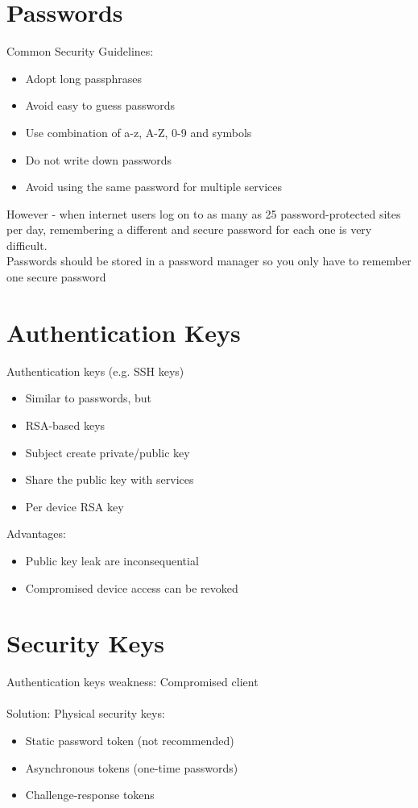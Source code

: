 \documentclass{article}[18pt]
\begin{document}
\section{Passwords}
Common Security Guidelines:
\begin{itemize}
	\item Adopt long passphrases
	\item Avoid easy to guess passwords
	\item Use combination of a-z, A-Z, 0-9 and symbols
	\item Do not write down passwords
	\item Avoid using the same password for multiple services
\end{itemize}
However - when internet users log on to as many as 25 password-protected sites per day, remembering a different and secure password for each one is very difficult.\\
Passwords should be stored in a password manager so you only have to remember one secure password
\section{Authentication Keys}
Authentication keys (e.g. SSH keys)
\begin{itemize}
	\item Similar to passwords, but
	\item RSA-based keys
	\item Subject create private/public key
	\item Share the public key with services
	\item Per device RSA key
\end{itemize}
Advantages:
\begin{itemize}
	\item Public key leak are inconsequential
	\item Compromised device access can be revoked
\end{itemize}
\section{Security Keys}
Authentication keys weakness: Compromised client\\
\\
Solution: Physical security keys:
\begin{itemize}
	\item Static password token (not recommended)
	\item Asynchronous tokens (one-time passwords)
	\item Challenge-response tokens
\end{itemize}
\end{document}
